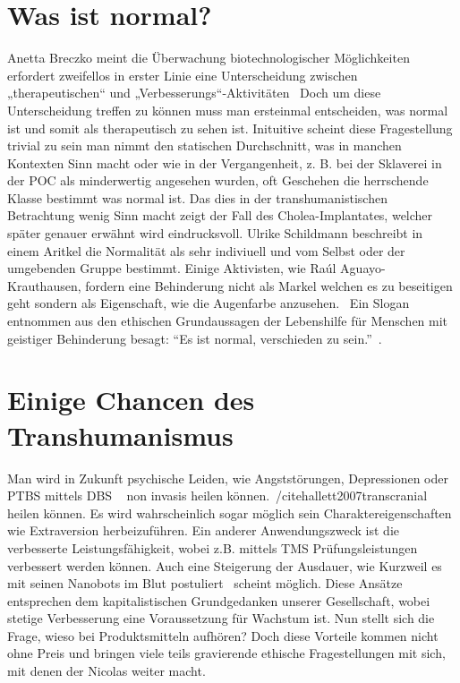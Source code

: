 \documentclass[a4paper,
DIV=13,
12pt,
BCOR=10mm,
department=FakEI,
twoside,
parskip=half,
automark,
]{OTHRartcl}
\begin{document}
\section*{Was ist normal?}
Anetta Breczko meint die Überwachung biotechnologischer Möglichkeiten erfordert zweifellos in erster Linie eine Unterscheidung zwischen „therapeutischen“ und „Verbesserungs“-Aktivitäten~\cite{breczko2021human}
Doch um diese Unterscheidung treffen zu können muss man ersteinmal entscheiden, was normal ist und somit als therapeutisch zu sehen ist. Inituitive scheint diese Fragestellung trivial zu sein
man nimmt den statischen Durchschnitt, was in manchen Kontexten Sinn macht oder wie in der Vergangenheit, z. B. bei der Sklaverei in der POC als minderwertig angesehen wurden, oft Geschehen die herrschende Klasse
bestimmt was normal ist. Das dies in der transhumanistischen Betrachtung wenig Sinn macht zeigt der Fall des Cholea-Implantates, welcher später genauer erwähnt wird eindrucksvoll. Ulrike Schildmann beschreibt in einem 
Aritkel die Normalität als sehr indiviuell und vom Selbst oder der umgebenden Gruppe bestimmt.\cite{schildmann1999normal} Einige Aktivisten, wie Raúl Aguayo-Krauthausen, fordern
eine Behinderung nicht als Markel welchen es zu beseitigen geht sondern als Eigenschaft, wie die Augenfarbe anzusehen.~\cite{aguayo2023inklusion} Ein Slogan entnommen aus den ethischen Grundaussagen der Lebenshilfe
für Menschen mit geistiger Behinderung besagt: ``Es ist normal, verschieden zu sein.''~\cite{lebenshilfeFlyer}.

\section*{Einige Chancen des Transhumanismus}
Man wird in Zukunft psychische Leiden, wie Angststörungen, Depressionen oder PTBS mittels DBS ~\cite{perlmutter2006deep} non invasis heilen können.~/cite{hallett2007transcranial} heilen können. Es wird wahrscheinlich sogar möglich sein Charaktereigenschaften wie Extraversion herbeizuführen. Ein anderer Anwendungszweck ist die verbesserte Leistungsfähigkeit, wobei z.B. mittels TMS
Prüfungsleistungen~\cite{luber2014enhancement} verbessert werden können. Auch eine Steigerung der Ausdauer, wie Kurzweil es mit seinen Nanobots im Blut postuliert~\cite{kurzweil2005singularity} scheint möglich. Diese Ansätze entsprechen dem kapitalistischen Grundgedanken
unserer Gesellschaft, wobei stetige Verbesserung eine Voraussetzung für Wachstum ist. Nun stellt sich die Frage, wieso bei Produktsmitteln aufhören? Doch diese Vorteile kommen nicht ohne Preis und bringen viele teils gravierende
ethische Fragestellungen mit sich, mit denen der Nicolas weiter macht.
\end{document}
